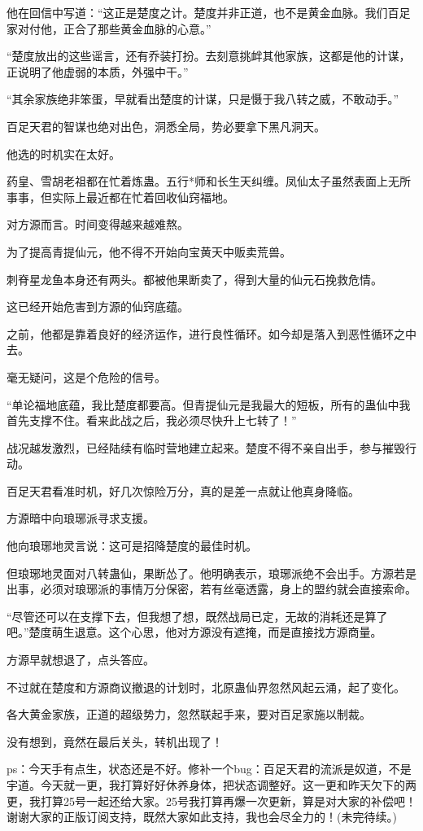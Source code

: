 \begin{this_body}
他在回信中写道：“这正是楚度之计。楚度并非正道，也不是黄金血脉。我们百足家对付他，正合了那些黄金血脉的心意。”

“楚度放出的这些谣言，还有乔装打扮。去刻意挑衅其他家族，这都是他的计谋，正说明了他虚弱的本质，外强中干。”

“其余家族绝非笨蛋，早就看出楚度的计谋，只是慑于我八转之威，不敢动手。”

百足天君的智谋也绝对出色，洞悉全局，势必要拿下黑凡洞天。

他选的时机实在太好。

药皇、雪胡老祖都在忙着炼蛊。五行*师和长生天纠缠。凤仙太子虽然表面上无所事事，但实际上最近都在忙着回收仙窍福地。

对方源而言。时间变得越来越难熬。

为了提高青提仙元，他不得不开始向宝黄天中贩卖荒兽。

刺脊星龙鱼本身还有两头。都被他果断卖了，得到大量的仙元石挽救危情。

这已经开始危害到方源的仙窍底蕴。

之前，他都是靠着良好的经济运作，进行良性循环。如今却是落入到恶性循环之中去。

毫无疑问，这是个危险的信号。

“单论福地底蕴，我比楚度都要高。但青提仙元是我最大的短板，所有的蛊仙中我首先支撑不住。看来此战之后，我必须尽快升上七转了！”

战况越发激烈，已经陆续有临时营地建立起来。楚度不得不亲自出手，参与摧毁行动。

百足天君看准时机，好几次惊险万分，真的是差一点就让他真身降临。

方源暗中向琅琊派寻求支援。

他向琅琊地灵言说：这可是招降楚度的最佳时机。

但琅琊地灵面对八转蛊仙，果断怂了。他明确表示，琅琊派绝不会出手。方源若是出事，必须对琅琊派的事情万分保密，若有丝毫透露，身上的盟约就会直接索命。

“尽管还可以在支撑下去，但我想了想，既然战局已定，无故的消耗还是算了吧。”楚度萌生退意。这个心思，他对方源没有遮掩，而是直接找方源商量。

方源早就想退了，点头答应。

不过就在楚度和方源商议撤退的计划时，北原蛊仙界忽然风起云涌，起了变化。

各大黄金家族，正道的超级势力，忽然联起手来，要对百足家施以制裁。

没有想到，竟然在最后关头，转机出现了！

ps：今天手有点生，状态还是不好。修补一个bug：百足天君的流派是奴道，不是宇道。今天就一更，我打算好好休养身体，把状态调整好。这一更和昨天欠下的两更，我打算25号一起还给大家。25号我打算再爆一次更新，算是对大家的补偿吧！谢谢大家的正版订阅支持，既然大家如此支持，我也会尽全力的！(未完待续。)

\end{this_body}

